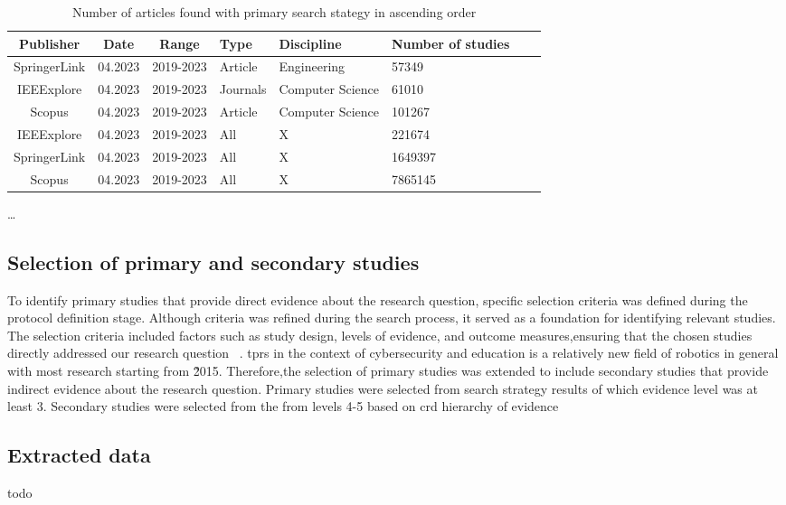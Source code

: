 \begin{table}[htb]
  \centering
  \caption{Number of articles found with primary search stategy in ascending order}
  \label{tab:query-results}
  \begin{tabularx}{\textwidth}{|c|c|c|Y|Y|Y|Y|Y|}
    \hline
    \textbf{Publisher} & \textbf{Date} & \textbf{Range} & \textbf{Type} & \textbf{Discipline} & \textbf{Number of studies} \\\hline
    SpringerLink       & 04.2023       & 2019-2023      & Article       & Engineering         & 57349                      \\\hline
    IEEExplore         & 04.2023       & 2019-2023      & Journals      & Computer Science    & 61010                      \\\hline
    Scopus             & 04.2023       & 2019-2023      & Article       & Computer Science    & 101267                     \\\hline
    IEEExplore         & 04.2023       & 2019-2023      & All           & X                   & 221674                     \\\hline
    SpringerLink       & 04.2023       & 2019-2023      & All           & X                   & 1649397                    \\\hline
    Scopus             & 04.2023       & 2019-2023      & All           & X                   & 7865145                    \\\hline
  \end{tabularx}
\end{table}

\ldots

\subsection{Selection of primary and secondary studies}\label{subsec:selection-of-studies}

To identify primary studies that provide direct evidence about the research question, specific selection criteria was defined during the
protocol definition stage. Although criteria was refined during the search process, it served as a foundation for identifying
relevant studies. The selection criteria included factors such as study design, levels of evidence, and outcome measures,ensuring that the
chosen studies directly addressed our research question ~\cite[10-16]{systematic_review_2004}. \ac{tprs} in the context of cybersecurity
and education is a relatively new field of robotics in general with most research starting from 2̃015. Therefore,the selection of primary
studies was
extended to include secondary studies that provide indirect evidence about the research question. Primary studies were selected from search
strategy results of which evidence level was at least 3. Secondary studies were selected from the from levels 4-5 based on
\ac{crd} hierarchy of evidence~\cite[11]{systematic_review_2004}

\subsection{Extracted data}\label{subsec:extracted-data}

todo
